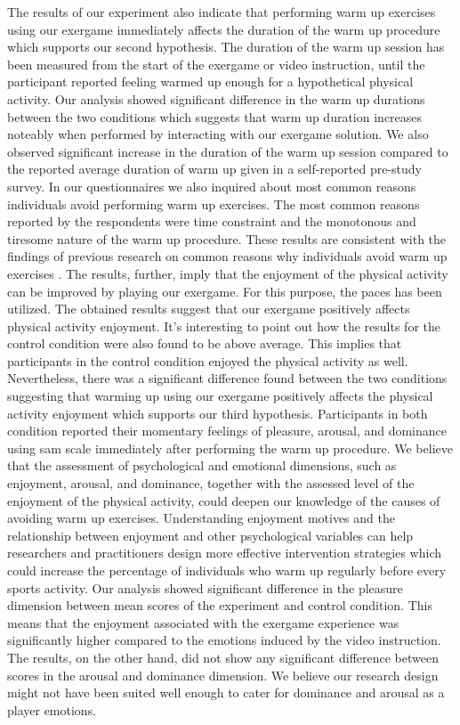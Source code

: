 The results of our experiment also indicate that performing warm up exercises using our exergame immediately affects the duration of the warm up procedure which supports our second hypothesis. The duration of the warm up session has been measured from the start of the exergame or video instruction, until the participant reported feeling warmed up enough for a hypothetical physical activity. Our analysis showed significant difference in the warm up durations between the two conditions which suggests that warm up duration increases noteably when performed by interacting with our exergame solution. We also observed significant increase in the duration of the warm up session compared to the reported average duration of warm up given in a self-reported pre-study survey. In our questionnaires we also inquired about most common reasons individuals avoid performing warm up exercises. The most common reasons reported by the respondents were time constraint and the monotonous and tiresome nature of the warm up procedure. These results are consistent with the findings of previous research on common reasons why individuals avoid warm up exercises \cite{fradkin2010effects}. The results, further, imply that the enjoyment of the physical activity can be improved by playing our exergame. For this purpose, the \acrlong{paces} has been utilized. The obtained results suggest that our exergame positively affects physical activity enjoyment. It's interesting to point out how the results for the control condition were also found to be above average. This implies that participants in the control condition enjoyed the physical activity as well.  Nevertheless, there was a significant difference found between the two conditions suggesting that warming up using our exergame positively affects the physical activity enjoyment which supports our third hypothesis. Participants  in both condition reported their momentary feelings of pleasure, arousal, and dominance using  \acrlong{sam} scale immediately after performing the warm up procedure. We believe that the assessment of psychological and emotional dimensions, such as enjoyment, arousal, and dominance, together with the assessed level of the enjoyment of the physical activity, could deepen our knowledge of the causes of avoiding warm up exercises. Understanding enjoyment motives and the relationship between enjoyment and other psychological variables can help researchers and practitioners design more effective intervention strategies which could increase the percentage of individuals who warm up regularly before every sports activity. Our analysis showed significant difference in the pleasure dimension between mean scores of the experiment and control condition. This means that the enjoyment associated with the exergame experience was significantly higher compared to the emotions induced by the video instruction. The results, on the other hand, did not show any significant difference between scores in the arousal and dominance dimension. We believe our research design might not have been suited well enough to cater for dominance and arousal as a player emotions.\\\\\\
